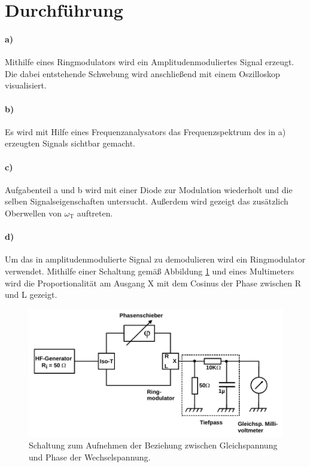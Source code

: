 \section{Durchf\"{u}hrung}

\paragraph{a)}
\label{par:a}
Mithilfe eines Ringmodulators wird ein Amplitudenmoduliertes Signal erzeugt. Die dabei entstehende Schwebung wird anschließend mit einem
Oszilloskop visualisiert.

\paragraph{b)}
\label{par:b}
Es wird mit Hilfe eines Frequenzanalysators das Frequenzspektrum des in a) erzeugten Signals sichtbar gemacht.

\paragraph{c)}
\label{par:c}
Aufgabenteil a und b wird mit einer Diode zur Modulation wiederholt und die selben Signalseigenschaften untersucht.
Außerdem wird gezeigt das zusätzlich Oberwellen von $\omega_\text{T}$ auftreten.

\paragraph{d)}
\label{par:d}
Um das in amplitudenmodulierte Signal zu demodulieren wird ein Ringmodulator verwendet.
Mithilfe einer Schaltung gemäß Abbildung \ref{Abb14} und eines Multimeters wird die Proportionalität am Ausgang X mit dem Cosinus der Phase zwischen R und L gezeigt.

\begin{figure}
	\centering
	\includegraphics[width=\textwidth]{img/Abb14.pdf}
	\caption{Schaltung zum Aufnehmen der Beziehung zwischen Gleichspannung und Phase der Wechselspannung. \cite{FP}}
	\label{Abb14}
\end{figure}

